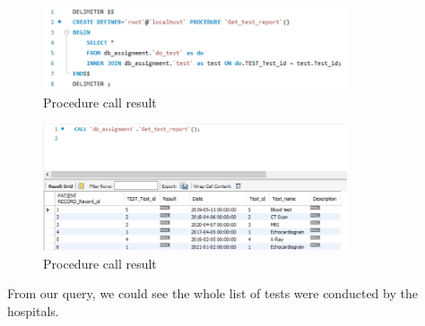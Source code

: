 \begin{figure}[H]
  \centering
  \includegraphics[width=0.8\textwidth]{assets/procedure_3a.png}
  \captionsetup{justification=centering,margin=2cm}
  \caption{Procedure call result}
\end{figure}

\begin{figure}[H]
  \centering
  \includegraphics[width=0.8\textwidth]{assets/procedure_3b.png}
  \captionsetup{justification=centering,margin=2cm}
  \caption{Procedure call result}
\end{figure}

From our query, we could see the whole list of tests were conducted by the hospitals.
